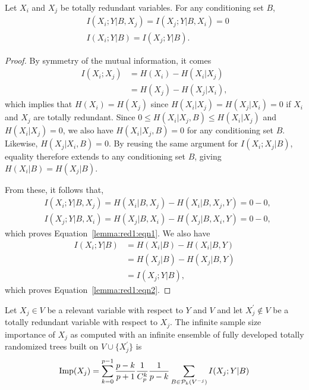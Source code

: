 \begin{lemma}\label{lemma:red1}
Let $X_i$ and $X_j$ be totally redundant variables. For any conditioning set
$B$,
\begin{align}
& I(X_i;Y|B,X_j) = I(X_j;Y|B, X_i) = 0 \label{lemma:red1:eqn1} \\
& I(X_i;Y|B) = I(X_j;Y|B) \label{lemma:red1:eqn2}.
\end{align}
\end{lemma}

\begin{proof}
By symmetry of the mutual information, it comes
\begin{align}
I(X_i;X_j) &= H(X_i) - H(X_i|X_j) \nonumber \\
           &= H(X_j) - H(X_j|X_i),
\end{align}
which implies that $H(X_i) = H(X_j)$ since $H(X_i|X_j) = H(X_j|X_i) = 0$ if
$X_i$ and $X_j$ are totally redundant. Since $0 \leq H(X_i|X_j,B) \leq
H(X_i|X_j)$ and $H(X_i|X_j)=0$, we also have $H(X_i|X_j,B)=0$ for any conditioning
set $B$. Likewise, $H(X_j|X_i,B)=0$. By reusing the same argument for $I(X_i;X_j|B)$, equality
therefore extends to any conditioning set $B$, giving $H(X_i|B) = H(X_j|B)$.

From these, it follows that,
\begin{align}
& I(X_i;Y|B,X_j) = H(X_i|B, X_j) - H(X_i|B,X_j,Y) = 0 - 0, \\
& I(X_j;Y|B,X_i) = H(X_j|B, X_i) - H(X_j|B,X_i,Y) = 0 - 0,
\end{align}
which proves Equation~\ref{lemma:red1:eqn1}. We also have
\begin{align}
I(X_i;Y|B) &= H(X_i|B) - H(X_i|B,Y) \\
           &= H(X_j|B) - H(X_j|B,Y) \\
           &= I(X_j;Y|B),
\end{align}
which proves Equation~\ref{lemma:red1:eqn2}.
\end{proof}

\begin{proposition}\label{prop:red:self}
Let $X_j\in V$ be a relevant variable with respect to $Y$ and $V$ and let
$X_j^\prime \notin V$ be a totally redundant variable with respect to $X_j$.
The infinite sample size importance of $X_j$ as computed with an infinite
ensemble of fully developed totally randomized trees built on $V\cup
\{X_j^\prime\}$ is
\begin{equation}
\text{Imp}(X_j) = \sum_{k=0}^{p-1} \frac{p-k}{p+1} \frac{1}{C_p^k} \frac{1}{p-k} \sum_{B \in {\cal P}_k(V^{-j})} I(X_j;Y|B)
\end{equation}
\end{proposition}

